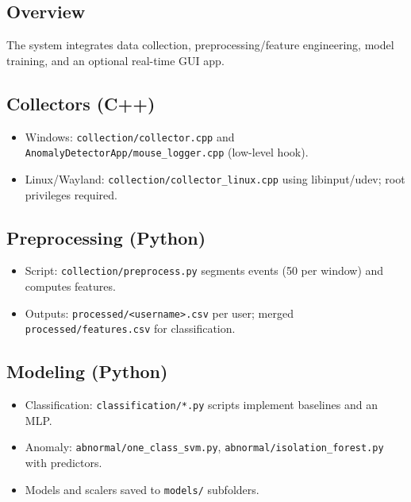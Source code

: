 \documentclass[
  12pt,
]{article}
\providecommand{\tightlist}{%
  \setlength{\itemsep}{0pt}\setlength{\parskip}{0pt}}
\begin{document}
\subsection{Overview}\label{overview}

The system integrates data collection, preprocessing/feature
engineering, model training, and an optional real-time GUI app.

\subsection{Collectors (C++)}\label{collectors-c}

\begin{itemize}
\tightlist
\item
  Windows: \texttt{collection/collector.cpp} and
  \texttt{AnomalyDetectorApp/mouse\_logger.cpp} (low-level hook).
\item
  Linux/Wayland: \texttt{collection/collector\_linux.cpp} using
  libinput/udev; root privileges required.
\end{itemize}

\subsection{Preprocessing (Python)}\label{preprocessing-python}

\begin{itemize}
\tightlist
\item
  Script: \texttt{collection/preprocess.py} segments events (50 per
  window) and computes features.
\item
  Outputs: \texttt{processed/\textless{}username\textgreater{}.csv} per
  user; merged \texttt{processed/features.csv} for classification.
\end{itemize}

\subsection{Modeling (Python)}\label{modeling-python}

\begin{itemize}
\tightlist
\item
  Classification: \texttt{classification/*.py} scripts implement
  baselines and an MLP.
\item
  Anomaly: \texttt{abnormal/one\_class\_svm.py},
  \texttt{abnormal/isolation\_forest.py} with predictors.
\item
  Models and scalers saved to \texttt{models/} subfolders.
\end{itemize}
\end{document}
